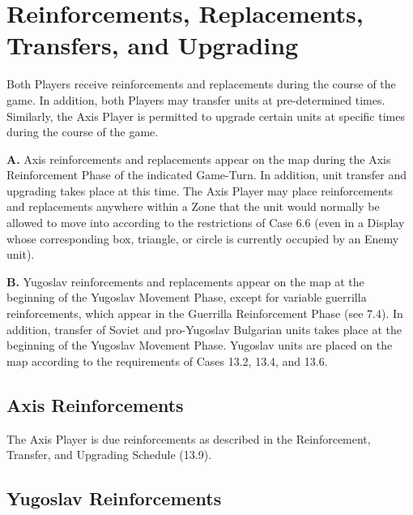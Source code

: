 \section{Reinforcements, Replacements, Transfers, and Upgrading}\label{sec:13.0}


\begin{generalrule}
Both Players receive reinforcements and replacements during the course of the game. In addition, both Players may transfer units at pre-determined times. Similarly, the Axis Player is permitted to upgrade certain units at specific times during the course of the game.
\end{generalrule}


\textbf{A.} Axis reinforcements and replacements appear on the map during the Axis Reinforcement Phase of the indicated Game-Turn. In addition, unit transfer and upgrading takes place at this time. The Axis Player may place reinforcements and replacements anywhere within a Zone that the unit would normally be allowed to move into according to the restrictions of Case 6.6 (even in a Display whose corresponding box, triangle, or circle is currently occupied by an Enemy unit).

\textbf{B.} Yugoslav reinforcements and replacements appear on the map at the
beginning of the Yugoslav Movement Phase, except for variable guerrilla
reinforcements, which appear in the Guerrilla Reinforcement Phase (see 7.4). In
addition, transfer of Soviet and pro-Yugoslav Bulgarian units takes place at the
beginning of the Yugoslav Movement Phase. Yugoslav units are placed on the map
according to the requirements of Cases 13.2, 13.4, and 13.6.

\subsection{Axis Reinforcements}\label{sec:13.1}

The Axis Player is due reinforcements as described in the Reinforcement, Transfer, and Upgrading Schedule (13.9).

\subsection{Yugoslav Reinforcements}\label{sec:13.2}


